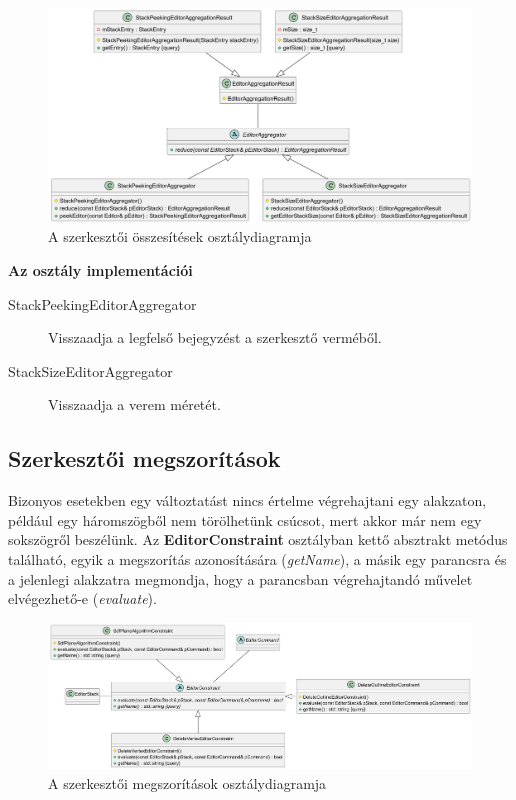 \begin{figure}[H]
	\centering
	\includegraphics[width=1\linewidth]{images/class_editor_aggregator.png}
	\caption{A szerkesztői összesítések osztálydiagramja}
	\label{fig:class_editor_aggregator-1}
\end{figure}

\textbf{Az osztály implementációi}

\begin{description}
	\item[StackPeekingEditorAggregator] Visszaadja a legfelső bejegyzést a szerkesztő verméből.
	\item[StackSizeEditorAggregator] Visszaadja a verem méretét.
\end{description}

\subsection{Szerkesztői megszorítások}

Bizonyos esetekben egy változtatást nincs értelme végrehajtani egy alakzaton, például egy háromszögből nem törölhetünk csúcsot, mert akkor már nem egy sokszögről beszélünk. Az \textbf{EditorConstraint} osztályban kettő absztrakt metódus található, egyik a megszorítás azonosítására (\textit{getName}), a másik egy parancsra és a jelenlegi alakzatra megmondja, hogy a parancsban végrehajtandó művelet elvégezhető-e (\textit{evaluate}).

\begin{figure}[H]
	\centering
	\includegraphics[width=1\linewidth]{images/class_editor_constraint.png}
	\caption{A szerkesztői megszorítások osztálydiagramja}
	\label{fig:class_editor_constraint-1}
\end{figure}

